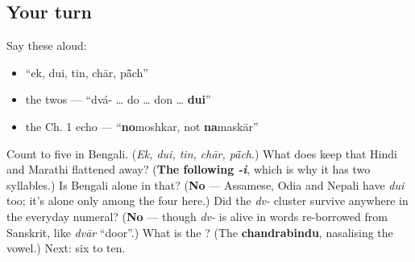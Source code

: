 \subsection*{Your turn}
Say these aloud:

\begin{itemize}
\raggedright
  \item \textquotedblleft{}ek, dui, tin, chār, pā̃ch\textquotedblright{}
  \item the twos — \textquotedblleft{}dvá- … do … don … \textbf{dui}\textquotedblright{}
  \item the Ch. 1 echo — \textquotedblleft{}\textbf{no}moshkar, not \textbf{na}maskār\textquotedblright{}
\end{itemize}

\begin{tcolorbox}[breakable,colback=teal!4,colframe=teal!35!black,title={Before you move on}]
Count to five in Bengali. (\emph{Ek, dui, tin, chār, pā̃ch}.) What does \textbf{} keep that Hindi and Marathi flattened away? (\textbf{The following \emph{-i}}, which is why it has two syllables.) Is Bengali alone in that? (\textbf{No} — Assamese, Odia and Nepali have \emph{dui} too; it's alone only among the four here.) Did the \emph{dv-} cluster survive anywhere in the everyday numeral? (\textbf{No} — though \emph{dv-} is alive in words re-borrowed from Sanskrit, like \emph{dvār} \textquotedblleft{}door\textquotedblright{}.) What is the \textbf{}? (The \textbf{chandrabindu}, nasalising the vowel.) Next: six to ten.
\end{tcolorbox}
